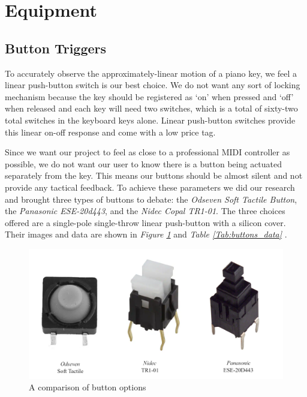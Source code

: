 \section{Equipment}
\subsection{Button Triggers}
To accurately observe the approximately-linear motion of a piano key, we feel a linear push-button switch is our best choice. We do not want any sort of locking mechanism because the key should be registered as ‘on’ when pressed and ‘off’ when released and each key will need two switches, which is a total of sixty-two total switches in the keyboard keys alone. Linear push-button switches provide this linear on-off response and come with a low price tag.

Since we want our project to feel as close to a professional MIDI controller as possible, we do not want our user to know there is a button being actuated separately from the key. This means our buttons should be almost silent and not provide any tactical feedback. To achieve these parameters we did our research and brought three types of buttons to debate: the \textit{Odseven Soft Tactile Button}, the \textit{Panasonic ESE-20d443}, and the \textit{Nidec Copal TR1-01}. The three choices offered are a single-pole single-throw linear push-button with a silicon cover. Their images and data are shown in \textit{Figure \ref{fig:buttons_fig}} and \textit{Table \ref{Tab:buttons_data}} .

\begin{figure}[h!]
  \centering
  \includegraphics[width=\linewidth]{image/Buttons.png}
  \caption{A comparison of button options}
  \label{fig:buttons_fig}
\end{figure}

